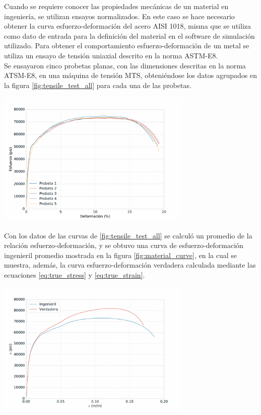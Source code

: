 Cuando se requiere conocer las propiedades mecánicas de un material en ingeniería, se utilizan ensayos 
normalizados. En este caso se hace necesario obtener la curva esfuerzo-deformación del 
acero AISI 1018, misma que se utiliza como dato de entrada para la definición del material 
en el software de simulación utilizado. Para obtener el comportamiento esfuerzo-deformación 
de un metal se utiliza un ensayo de tensión uniaxial descrito en la norma ASTM-E8. ~\cite{ASTME8} \\

Se ensayaron cinco probetas planas, con las dimensiones descritas en la norma ATSM-E8, en una 
máquina de tensión MTS, obteniéndose los datos agrupados en la figura \ref{fig:tensile_test_all} para 
cada una de las probetas.\\

\begin{center}
\includegraphics[width=0.7\textwidth]{src/ch3/tensile_test_all.pdf}
\label{fig:tensile_test_all}
\end{center}

Con los datos de las curvas de \ref{fig:tensile_test_all} se calculó un promedio de la relación esfuerzo-deformación, 
y se obtuvo una curva de esfuerzo-deformación ingenieril promedio mostrada en la figura \ref{fig:material_curve}, 
en la cual se muestra, además, la curva esfuerzo-deformación verdadera calculada mediante las ecuaciones 
\ref{eq:true_stress} y \ref{eq:true_strain}.

\begin{center}
\includegraphics[width=0.7\textwidth]{src/ch3/material_curve.pdf}
\label{fig:material_curve}
\end{center}


